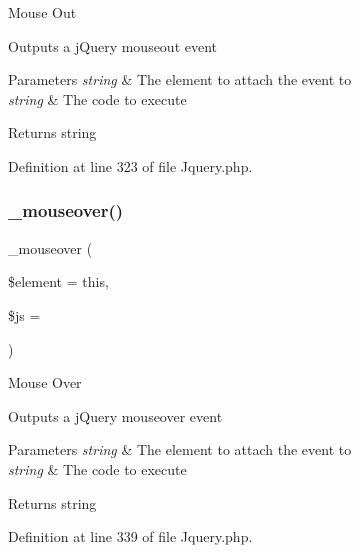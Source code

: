 Mouse Out

Outputs a j\+Query mouseout event


\begin{DoxyParams}{Parameters}
{\em string} & The element to attach the event to \\
\hline
{\em string} & The code to execute \\
\hline
\end{DoxyParams}
\begin{DoxyReturn}{Returns}
string 
\end{DoxyReturn}


Definition at line 323 of file Jquery.\+php.

\mbox{\label{class_c_i___jquery_abe38c17415cf07abb6de435525676dca}} 
\subsubsection{\texorpdfstring{\_mouseover()}{\_mouseover()}}
{\footnotesize\ttfamily \+\_\+mouseover (\begin{DoxyParamCaption}\item[{}]{\$element = {\ttfamily \textquotesingle{}this\textquotesingle{}},  }\item[{}]{\$js = {\ttfamily \textquotesingle{}\textquotesingle{}} }\end{DoxyParamCaption})\hspace{0.3cm}{\ttfamily [protected]}}

Mouse Over

Outputs a j\+Query mouseover event


\begin{DoxyParams}{Parameters}
{\em string} & The element to attach the event to \\
\hline
{\em string} & The code to execute \\
\hline
\end{DoxyParams}
\begin{DoxyReturn}{Returns}
string 
\end{DoxyReturn}


Definition at line 339 of file Jquery.\+php.

\mbox{\label{class_c_i___jquery_a78d654cce0aaa6de766809e56b727261}} 
